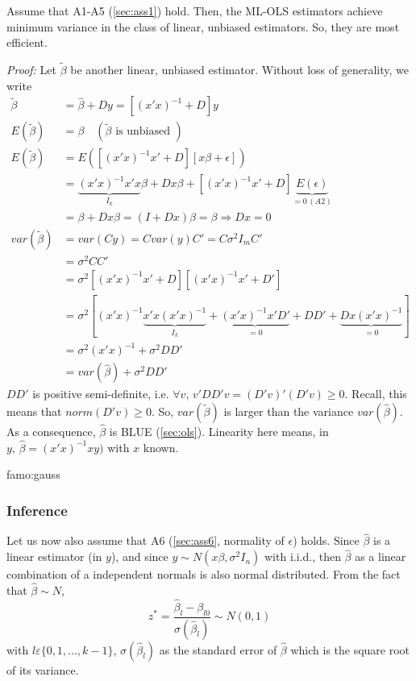 		Assume that A1-A5 (\ref{sec:ass1}) hold. Then, the ML-OLS estimators achieve minimum variance in the class of linear, unbiased estimators. So, they are most efficient.
		
		\emph{Proof:} Let $\tilde{\beta}$ be another linear, unbiased estimator. Without loss of generality, we write
		\begin{align*}
			\tilde{\beta}&=\hat{\beta}+Dy=\left[(x'x)^{-1}+D\right]y\\
			E(\tilde{\beta})&=\beta\quad(\tilde{\beta}\text{ is unbiased })\\
			E(\tilde{\beta})&=E\left(\left[(x'x)^{-1}x'+D\right]\left[x\beta+\epsilon\right]\right)\\
			&=\underbrace{(x'x)^{-1}x'x}_{I_k}\beta+Dx\beta+\left[(x'x)^{-1}x'+D\right]\underbrace{E(\epsilon)}_{=0\,(A2)}\\
			&=\beta+Dx\beta=(I+Dx)\beta=\beta\Longrightarrow Dx=0\\
			var(\tilde{\beta})&=var(Cy)=C var(y)C'=C\sigma^2 I_m C'\\
			&=\sigma^2 C C'\\
			&=\sigma^2 \left[(x'x)^{-1}x'+D\right]\left[(x'x)^{-1}x'+D'\right]\\
			&=\sigma^2 \left[(x'x)^{-1}\underbrace{x'x(x'x)^{-1}}_{I_k}+\underbrace{(x'x)^{-1}x'D'}_{=0}+D D' +\underbrace{Dx(x'x)^{-1}}_{=0}\right]\\
			&=\sigma^2(x'x)^{-1}+\sigma^2 D D'\\
			&=var(\hat{\beta})+\sigma^2 D D'
		\end{align*}
		$D D'$ is positive semi-definite, i.e. $\forall v,\,v' D D' v=(D'v)'(D'v)\geq 0$. Recall, this means that $norm(D'v)\geq 0$.	So, $var(\tilde{\beta})$ is larger than the variance $var(\hat{\beta})$. As a consequence, $\hat{\beta}$ is BLUE (\ref{sec:ols}). Linearity here means, in $y,\,\hat{\beta}=(x'x)^{-1}xy)$ with $x$ known.\begin{famo}{famo:gauss}
			
		\end{famo}	
			
\subsubsection{Inference}
	Let us now also assume that A6 (\ref{sec:ass6}, normality of $\epsilon$) holds. Since $\hat{\beta}$ is a linear estimator (in $y$), and since $y\sim N(x\beta,\sigma^2 I_n)$ with i.i.d., then $\hat{\beta}$ as a linear combination of a independent normals is also normal distributed.
		From the fact that $\hat{\beta}\sim N$,
		\begin{equation*}
			z^*=\frac{\hat{\beta}_l-\beta_{l0}}{\sigma(\hat{\beta}_l)}\sim N(0,1)
		\end{equation*}
		with $l\varepsilon\{0,1,...,k-1\}$, $\sigma(\hat{\beta}_l)$ as the standard error of $\hat{\beta}$ which is the square root of its variance. 
		
